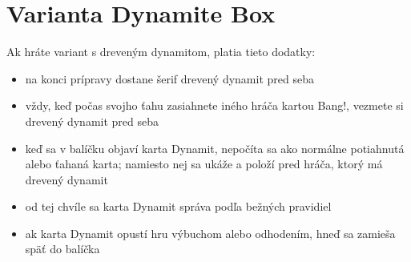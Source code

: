 \section*{Varianta Dynamite Box}
Ak hráte variant s dreveným dynamitom, platia tieto dodatky:
\begin{itemize}
    \item na konci prípravy dostane šerif drevený dynamit pred seba
    \item vždy, keď počas svojho ťahu zasiahnete iného hráča kartou Bang!, vezmete si drevený dynamit pred seba
    \item keď sa v balíčku objaví karta Dynamit, nepočíta sa ako normálne potiahnutá alebo ťahaná karta; namiesto nej sa ukáže a položí pred hráča, ktorý má drevený dynamit
    \item od tej chvíle sa karta Dynamit správa podľa bežných pravidiel
    \item ak karta Dynamit opustí hru výbuchom alebo odhodením, hneď sa zamieša späť do balíčka
\end{itemize}
